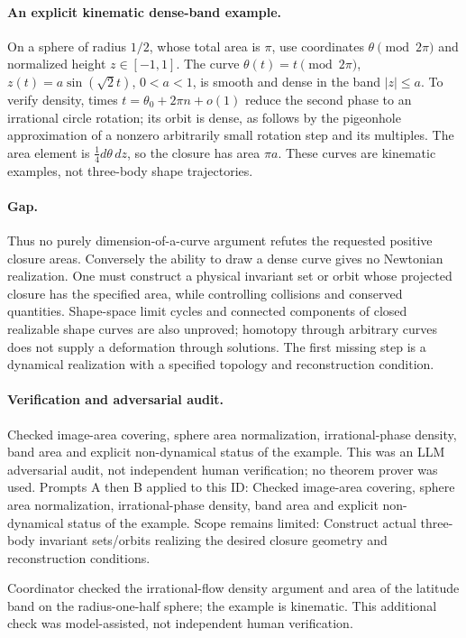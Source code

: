 \documentclass[11pt]{article}
\begin{document}
\paragraph{An explicit kinematic dense-band example.}On a sphere of radius \(1/2\), whose total area is \(\pi\), use coordinates \(\theta\pmod{2\pi}\) and normalized height \(z\in[-1,1]\). The curve \(\theta(t)=t\pmod{2\pi}\), \(z(t)=a\sin(\sqrt2t)\), \(0<a<1\), is smooth and dense in the band \(|z|\le a\). To verify density, times \(t=\theta_0+2\pi n+o(1)\) reduce the second phase to an irrational circle rotation; its orbit is dense, as follows by the pigeonhole approximation of a nonzero arbitrarily small rotation step and its multiples. The area element is \(\tfrac14d\theta\,dz\), so the closure has area \(\pi a\). These curves are kinematic examples, not three-body shape trajectories.
\paragraph{Gap.}Thus no purely dimension-of-a-curve argument refutes the requested positive closure areas. Conversely the ability to draw a dense curve gives no Newtonian realization. One must construct a physical invariant set or orbit whose projected closure has the specified area, while controlling collisions and conserved quantities. Shape-space limit cycles and connected components of closed realizable shape curves are also unproved; homotopy through arbitrary curves does not supply a deformation through solutions. The first missing step is a dynamical realization with a specified topology and reconstruction condition.

\paragraph{Verification and adversarial audit.}
Checked image-area covering, sphere area normalization, irrational-phase density, band area and explicit non-dynamical status of the example. This was an LLM adversarial audit, not independent human verification; no theorem prover was used. Prompts A then B applied to this ID: Checked image-area covering, sphere area normalization, irrational-phase density, band area and explicit non-dynamical status of the example. Scope remains limited: Construct actual three-body invariant sets/orbits realizing the desired closure geometry and reconstruction conditions.

Coordinator checked the irrational-flow density argument and area of the latitude band on the radius-one-half sphere; the example is kinematic. This additional check was model-assisted, not independent human verification.
\end{document}
